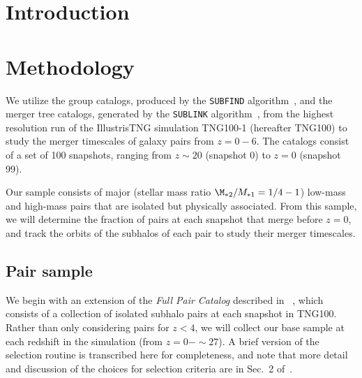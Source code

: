 \documentclass[twocolumn,linenumbers]{aastex631}
\newcommand{\paircat}{\textit{Full Pair Catalog}}
\begin{document}
\section{Introduction} \label{sec:intro}




\section{Methodology}
We utilize the group catalogs, produced by the \texttt{SUBFIND} algorithm~\citep{Springel2001,Dolag2009}, and the merger tree catalogs, generated by the \texttt{SUBLINK} algorithm~\citep{RG2015}, from the highest resolution run of the IllustrisTNG simulation TNG100-1 (hereafter TNG100) to study the merger timescales of galaxy pairs from $z=0-6$.
The catalogs consist of a set of 100 snapshots, ranging from $z\sim20$ (snapshot 0) to $z=0$ (snapshot 99).

Our sample consists of major (stellar mass ratio $\M_{*2}/M_{*1}= 1/4 - 1$) low-mass and high-mass pairs that are isolated but physically associated.
From this sample, we will determine the fraction of pairs at each snapshot that merge before $z=0$, and track the orbits of the subhalos of each pair to study their merger timescales.

\subsection{Pair sample}
We begin with an extension of the \paircat{} described in ~\citet{Chamberlain2024}, which consists of a collection of isolated subhalo pairs at each snapshot in TNG100. 
Rather than only considering pairs for $z<4$, we will collect our base sample at each redshift in the simulation (from $z=0-\sim 27$). 
A brief version of the selection routine is transcribed here for completeness, and note that more detail and discussion of the choices for selection criteria are in Sec.~2 of~\citet{Chamberlain2024}. 
\end{document}
